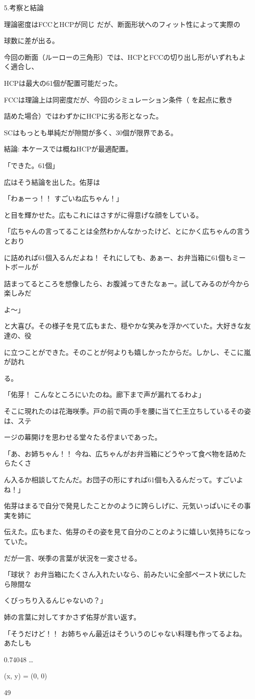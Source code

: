 5.考察と結論\par
理論密度はFCCとHCPが同じ だが、断⾯形状へのフィット性によって実際の\par
球数に差が出る。\par
今回の断⾯（ルーローの三⾓形）では、HCPとFCCの切り出し形がいずれもよく適合し、\par
HCPは最⼤の61個が配置可能だった。\par
FCCは理論上は同密度だが、今回のシミュレーション条件（ を起点に敷き\par
詰めた場合）ではわずかにHCPに劣る形となった。\par
SCはもっとも単純だが隙間が多く、30個が限界である。\par
結論: 本ケースでは概ねHCPが最適配置。\par
「できた。61個」\par
広はそう結論を出した。佑芽は\par
「わぁーっ！！ すごいね広ちゃん！」\par
と⽬を輝かせた。広もこれにはさすがに得意げな顔をしている。\par
「広ちゃんの⾔ってることは全然わかんなかったけど、とにかく広ちゃんの⾔うとおり\par
に詰めれば61個⼊るんだよね！ それにしても、あぁー、お弁当箱に61個もミートボールが\par
詰まってるところを想像したら、お腹減ってきたなぁー。試してみるのが今から楽しみだ\par
よ～」\par
と⼤喜び。その様⼦を⾒て広もまた、穏やかな笑みを浮かべていた。⼤好きな友達の、役\par
に⽴つことができた。そのことが何よりも嬉しかったからだ。しかし、そこに嵐が訪れ\par
る。\par
「佑芽！ こんなところにいたのね。廊下まで声が漏れてるわよ」\par
そこに現れたのは花海咲季。⼾の前で両の⼿を腰に当て仁王⽴ちしているその姿は、ステ\par
ージの幕開けを思わせる堂々たる佇まいであった。\par
「あ、お姉ちゃん！！ 今ね、広ちゃんがお弁当箱にどうやって⾷べ物を詰めたらたくさ\par
ん⼊るか相談してたんだ。お団⼦の形にすれば61個も⼊るんだって。すごいよね！」\par
佑芽はまるで⾃分で発⾒したことかのように誇らしげに、元気いっぱいにその事実を姉に\par
伝えた。広もまた、佑芽のその姿を⾒て⾃分のことのように嬉しい気持ちになっていた。\par
だが⼀⾔、咲季の⾔葉が状況を⼀変させる。\par
「球状？ お弁当箱にたくさん⼊れたいなら、前みたいに全部ペースト状にしたら隙間な\par
くびっちり⼊るんじゃないの？」\par
姉の⾔葉に対してすかさず佑芽が⾔い返す。\par
「そうだけど！！ お姉ちゃん最近はそういうのじゃない料理も作ってるよね。あたしも\par
0.74048 …\par
(x, y) = (0, 0)\par
49\par

